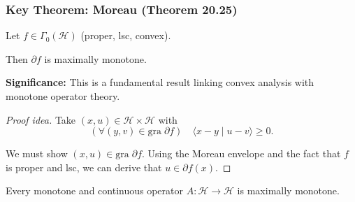 \documentclass[aspectratio=169,10pt]{beamer}
\newcommand{\gra}{\mathrm{gra}\;}
\newcommand{\inprod}[2]{\langle #1 \mid #2 \rangle}
\newcommand{\Hilbert}{\mathcal{H}}
\begin{document}
\begin{frame}
    \frametitle{Key Theorem: Moreau (Theorem 20.25)}

    \begin{theorem}
        Let $f \in \Gamma_0(\Hilbert)$ (proper, lsc, convex).

        Then $\partial f$ is maximally monotone.
    \end{theorem}

    \vspace{1em}

    \textbf{Significance:} This is a fundamental result linking convex analysis with monotone operator theory.

    \vspace{1em}

    \begin{proof}[Proof idea]
        Take $(x, u) \in \Hilbert \times \Hilbert$ with
        \[
            (\forall (y,v) \in \gra \partial f) \quad \inprod{x - y}{u - v} \geq 0.
        \]

        We must show $(x, u) \in \gra \partial f$. Using the Moreau envelope and the fact that
        $f$ is proper and lsc, we can derive that $u \in \partial f(x)$.
    \end{proof}

    \vspace{1em}

    \begin{corollary}[Corollary 20.28]
        Every monotone and continuous operator $A : \Hilbert \to \Hilbert$ is maximally monotone.
    \end{corollary}
\end{frame}
\end{document}
